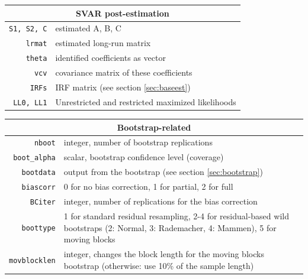 \documentclass[a4paper,10pt]{article}
\begin{document}
    \begin{tabular}{rp{}}
    \hline
    \multicolumn{2}{c}{\textbf{SVAR post-estimation}} \\
    \hline
    \texttt{S1, S2, C} & estimated A, B, C \\
    \texttt{lrmat} & estimated long-run matrix \\ 
    \texttt{theta} & identified coefficients as vector \\
    \texttt{vcv} & covariance matrix of these coefficients \\
    \texttt{IRFs}  & IRF matrix (see section \ref{sec:baseest})\\
    \texttt{LL0, LL1} & Unrestricted and restricted maximized likelihoods \\
     \end{tabular}
    
    \begin{tabular}{rp{}}
    \hline
    \multicolumn{2}{c}{\textbf{Bootstrap-related}} \\
    \hline
    \texttt{nboot}	 & integer, number of bootstrap replications \\
    \texttt{boot\_alpha} & scalar, bootstrap confidence level (coverage)\\
    \texttt{bootdata}	 & output from the bootstrap (see section \ref{sec:bootstrap})\\
    \texttt{biascorr}	 & 0 for no bias correction, 1 for
    partial, 2 for full\\
    \texttt{BCiter} & integer, number of replications for the bias correction \\
    \texttt{boottype}   & 1 for standard residual resampling, 2-4 for residual-based 
    wild bootstraps (2: Normal, 3: Rademacher, 4: Mammen), 5 for moving blocks \\
    \texttt{movblocklen} & integer, changes the block length for the moving blocks bootstrap
      (otherwise: use 10\% of the sample length)
     \end{tabular}
     
\end{document}
